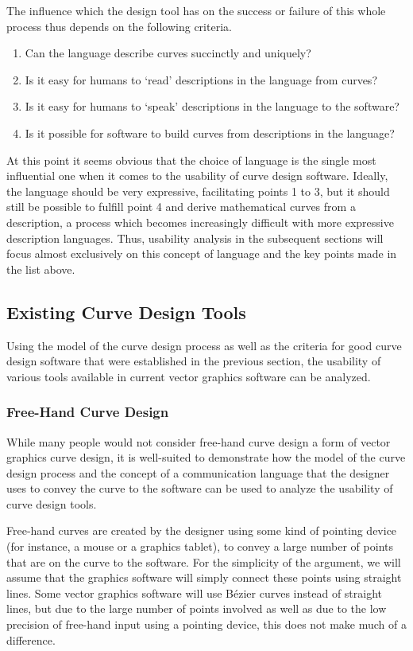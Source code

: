 \documentclass[a4paper]{article}
\begin{document}
			The influence which the design tool has on the success or failure of this whole process thus depends on the following criteria.

			\begin{enumerate}
				\item Can the language describe curves succinctly and uniquely?
				\item Is it easy for humans to `read' descriptions in the language from curves?
				\item Is it easy for humans to `speak' descriptions in the language to the software?
				\item Is it possible for software to build curves from descriptions in the language?
			\end{enumerate}

			At this point it seems obvious that the choice of language is the single most influential one when it comes to the usability of curve design software. Ideally, the language should be very expressive, facilitating points 1 to 3, but it should still be possible to fulfill point 4 and derive mathematical curves from a description, a process which becomes increasingly difficult with more expressive description languages. Thus, usability analysis in the subsequent sections will focus almost exclusively on this concept of language and the key points made in the list above.

		\subsection{Existing Curve Design Tools}

			Using the model of the curve design process as well as the criteria for good curve design software that were established in the previous section, the usability of various tools available in current vector graphics software can be analyzed.

			\subsubsection{Free-Hand Curve Design}

				While many people would not consider free-hand curve design a form of vector graphics curve design, it is well-suited to demonstrate how the model of the curve design process and the concept of a communication language that the designer uses to convey the curve to the software can be used to analyze the usability of curve design tools.

				Free-hand curves are created by the designer using some kind of pointing device (for instance, a mouse or a graphics tablet), to convey a large number of points that are on the curve to the software. For the simplicity of the argument, we will assume that the graphics software will simply connect these points using straight lines. Some vector graphics software will use Bézier curves instead of straight lines, but due to the large number of points involved as well as due to the low precision of free-hand input using a pointing device, this does not make much of a difference.
\end{document}

